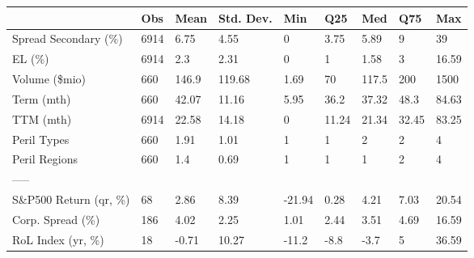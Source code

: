 \begin{tabular}{lllllllll}
\toprule
{} &   Obs &   Mean & Std. Dev. &    Min &    Q25 &    Med &    Q75 &    Max \\
\midrule
Spread Secondary (\%)  &  6914 &   6.75 &      4.55 &      0 &   3.75 &   5.89 &      9 &     39 \\
EL (\%)                &  6914 &    2.3 &      2.31 &      0 &      1 &   1.58 &      3 &  16.59 \\
Volume (\$mio)         &   660 &  146.9 &    119.68 &   1.69 &     70 &  117.5 &    200 &   1500 \\
Term (mth)            &   660 &  42.07 &     11.16 &   5.95 &   36.2 &  37.32 &   48.3 &  84.63 \\
TTM (mth)             &  6914 &  22.58 &     14.18 &      0 &  11.24 &  21.34 &  32.45 &  83.25 \\
Peril Types           &   660 &   1.91 &      1.01 &      1 &      1 &      2 &      2 &      4 \\
Peril Regions         &   660 &    1.4 &      0.69 &      1 &      1 &      1 &      2 &      4 \\
-----                 &       &        &           &        &        &        &        &        \\
S\&P500 Return (qr, \%) &    68 &   2.86 &      8.39 & -21.94 &   0.28 &   4.21 &   7.03 &  20.54 \\
Corp. Spread (\%)      &   186 &   4.02 &      2.25 &   1.01 &   2.44 &   3.51 &   4.69 &  16.59 \\
RoL Index (yr, \%)     &    18 &  -0.71 &     10.27 &  -11.2 &   -8.8 &   -3.7 &      5 &  36.59 \\
\bottomrule
\end{tabular}
